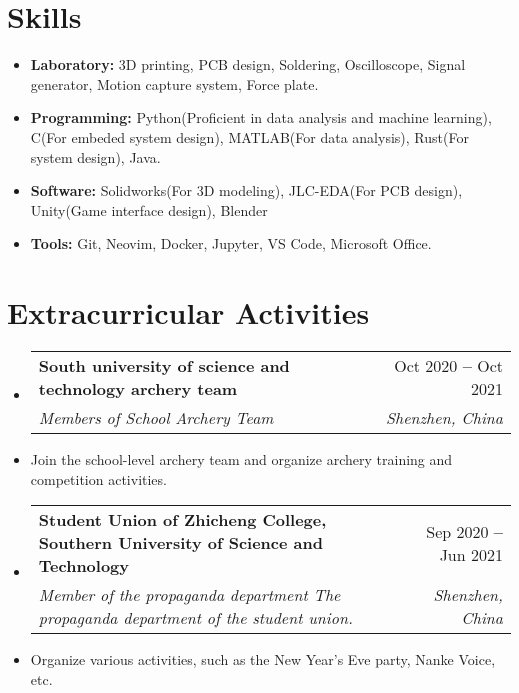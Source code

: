 \documentclass[letterpaper,11pt]{article}
\makeatletter
\newcommand{\resumeItem}[1]{
  \item\small{
    {#1 \vspace{-2pt}}
  }
}
\newcommand{\resumeSubheading}[4]{
  \vspace{-2pt}\item
    \begin{tabular*}{0.97\textwidth}[t]{l@{\extracolsep{\fill}}r}
      \textbf{#1} & #2 \\
      \textit{\small#3} & \textit{\small #4} \\
    \end{tabular*}\vspace{-7pt}
}
\newcommand{\resumeSubHeadingListStart}{\begin{itemize}[leftmargin=0.15in, label={}]}
\newcommand{\resumeSubHeadingListEnd}{\end{itemize}}
\newcommand{\resumeItemListStart}{\begin{itemize}}
\newcommand{\resumeItemListEnd}{\end{itemize}\vspace{-5pt}}
\makeatother
\begin{document}
\section{Skills}
\resumeItemListStart
\resumeItem{\textbf{Laboratory:}
  3D printing, PCB design, Soldering, Oscilloscope, Signal generator, Motion capture system, Force plate.}
\resumeItem{\textbf{Programming:}
  Python(Proficient in data analysis and machine learning), C(For embeded system design), MATLAB(For
  data analysis), Rust(For system design), Java.
} \resumeItem{\textbf{Software:}
  Solidworks(For 3D modeling), JLC-EDA(For PCB design), Unity(Game interface design), Blender}
\resumeItem{\textbf{Tools:} Git, Neovim, Docker, Jupyter, VS Code, Microsoft Office.
}
\resumeItemListEnd

\section{Extracurricular Activities} \vspace{3pt}
\resumeSubHeadingListStart \resumeSubheading {South university of science and technology archery
  team}{Oct 2020 \textbf{--}
  Oct 2021} {Members of School Archery Team}{Shenzhen, China} \resumeItem{Join the school-level
  archery team and organize archery training and competition activities.
}

\resumeSubheading
{Student Union of Zhicheng College, Southern University of Science and Technology}{Sep 2020 \textbf{--}
  Jun 2021} {Member of the propaganda department The propaganda department of the student union.
}{Shenzhen, China}
\resumeItem{Organize various activities, such as the New Year's Eve party, Nanke Voice, etc.}
\resumeSubHeadingListEnd

\end{document}
